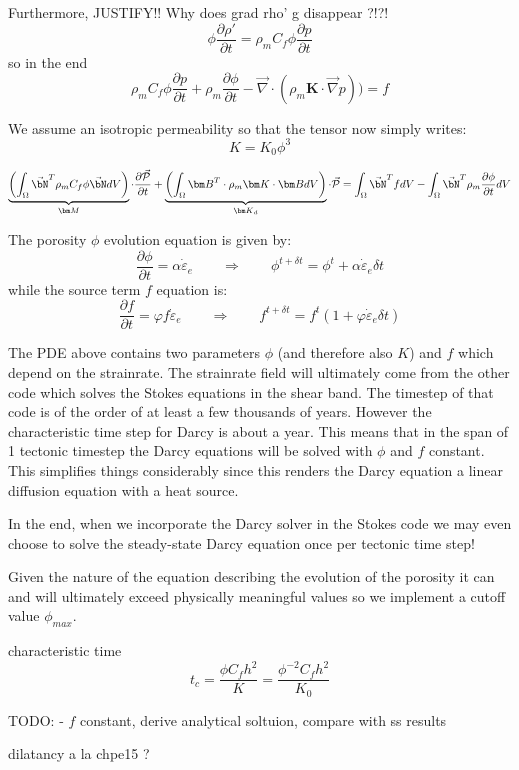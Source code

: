 Furthermore, JUSTIFY!! Why does grad rho' g disappear ?!?! 
\[
\phi \frac{\partial \rho'}{\partial t}
=
\rho_m C_f  \phi \frac{\partial p}{\partial t}
\]
so in the end 
\begin{equation}
\rho_m C_f  \phi \frac{\partial p}{\partial t}
+ \rho_m \frac{\partial \phi}{\partial t} 
- \vec\nabla \cdot (\rho_m {\bm K} \cdot \vec{\nabla} p ) ) = f
\end{equation}

We assume an isotropic permeability so that the tensor now simply writes:
\[
K = K_0 \phi^3
\]


\[
\underbrace{
\left( \int_\Omega \vec{\bN}^T \rho_m C_f \phi \vec{\bN} dV  \right)
}_{\bm M}
 \cdot \frac{\partial \vec{\cal P}}{\partial t}
+
\underbrace{
\left( \int_\Omega {\bm B}^T \cdot \rho_m {\bm K} \cdot {\bm B} dV \right)
}_{{\bm K}_d}
 \cdot \vec{\cal P}
=
\int_\Omega \vec{\bN}^T f dV 
-
\int_\Omega \vec{\bN}^T   \rho_m \frac{\partial \phi}{\partial t} dV
\]


The porosity $\phi$ evolution equation is given by:
\[
\frac{\partial \phi}{\partial t} = \alpha \dot{\varepsilon}_e
\qquad
\Rightarrow
\qquad
\phi^{t+\delta t} = \phi^t + \alpha \dot{\varepsilon}_e \delta t
\]
while the source term $f$ equation is:
\[
\frac{\partial f}{\partial t} = \varphi f \dot{\varepsilon}_e
\qquad
\Rightarrow
\qquad
f^{t+\delta t} = f^t (1 + \varphi  \dot{\varepsilon}_e \delta t)
\]

The PDE above contains two parameters $\phi$ (and therefore also $K$) and $f$
which depend on the strainrate. 
The strainrate field will ultimately come from the other code which 
solves the Stokes equations in the shear band. The timestep of that code 
is of the order of at least a few thousands of years. However the characteristic time step
for Darcy is about a year. This means that in the span of 1 tectonic timestep
the Darcy equations will be solved with $\phi$ and $f$ constant. 
This simplifies things considerably since this renders the Darcy equation a linear 
diffusion equation with a heat source. 

In the end, when we incorporate the Darcy solver in the Stokes code
we may even choose to solve the steady-state Darcy equation once per 
tectonic time step! 

Given the nature of the equation describing the evolution of the porosity
it can and will ultimately exceed physically meaningful values so we 
implement a cutoff value $\phi_{max}$.


characteristic time
\[
t_c 
= \frac{\phi C_f h^2}{K} 
= \frac{\phi^{-2} C_f h^2}{K_0} 
\]


TODO:
- $f$ constant, derive analytical soltuion, compare with ss results


dilatancy a la chpe15 ?
